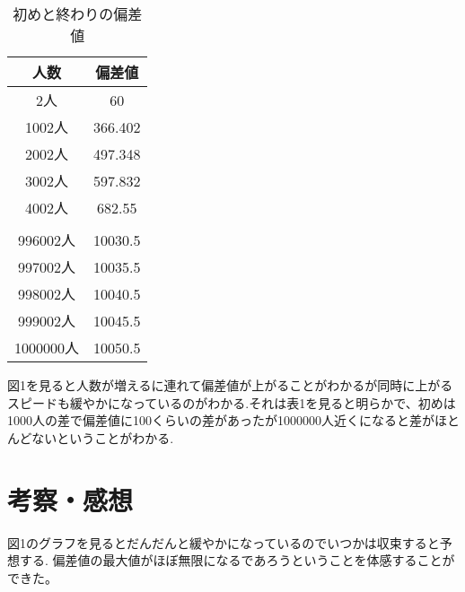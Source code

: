 \documentclass[dvipdfmx]{jsarticle}
\begin{document}
\begin{table}[H]
  \begin{center}
    \caption{初めと終わりの偏差値}
    \begin{tabular}{c|c}
      人数 & 偏差値 \\ \hline \hline
      2人 & 60 \\ \hline
      1002人 & 366.402 \\ \hline
      2002人 & 497.348 \\ \hline
      3002人 & 597.832 \\ \hline
      4002人 & 682.55 \\ \hline
            &        \\ \hline
      996002人 & 10030.5 \\ \hline
      997002人 & 10035.5 \\ \hline
      998002人 & 10040.5 \\ \hline
      999002人 & 10045.5 \\ \hline
      1000000人 & 10050.5 \\ \hline
    \end{tabular}
  \end{center}
\end{table}
図1を見ると人数が増えるに連れて偏差値が上がることがわかるが同時に上がるスピードも緩やかになっているのがわかる.それは表1を見ると明らかで、初めは1000人の差で偏差値に100くらいの差があったが1000000人近くになると差がほとんどないということがわかる.

\section{考察・感想}
図1のグラフを見るとだんだんと緩やかになっているのでいつかは収束すると予想する.
偏差値の最大値がほぼ無限になるであろうということを体感することができた。
\end{document}

